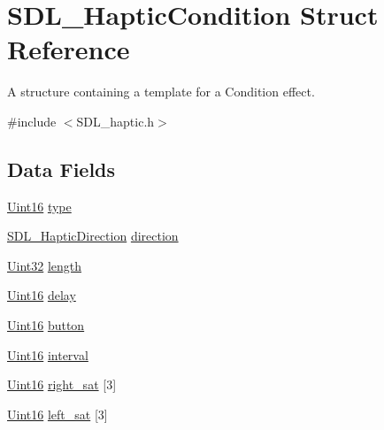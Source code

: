 \hypertarget{struct_s_d_l___haptic_condition}{}\section{S\+D\+L\+\_\+\+Haptic\+Condition Struct Reference}
\label{struct_s_d_l___haptic_condition}


A structure containing a template for a Condition effect.  




{\ttfamily \#include $<$S\+D\+L\+\_\+haptic.\+h$>$}

\subsection*{Data Fields}
\begin{DoxyCompactItemize}
\item 
\hyperlink{_s_d_l__stdinc_8h_a31fcc0a076c9068668173ee26d33e42b}{Uint16} \hyperlink{struct_s_d_l___haptic_condition_a8db4a3e9f29940892f2773bca31c74e1}{type}
\item 
\hyperlink{struct_s_d_l___haptic_direction}{S\+D\+L\+\_\+\+Haptic\+Direction} \hyperlink{struct_s_d_l___haptic_condition_a9fe6fc39233e26d6c0705ae77e43d96c}{direction}
\item 
\hyperlink{_s_d_l__stdinc_8h_add440eff171ea5f55cb00c4a9ab8672d}{Uint32} \hyperlink{struct_s_d_l___haptic_condition_afbde362d49894774c8b9c9e85ac0a913}{length}
\item 
\hyperlink{_s_d_l__stdinc_8h_a31fcc0a076c9068668173ee26d33e42b}{Uint16} \hyperlink{struct_s_d_l___haptic_condition_a069408e960d0f2ba482421f2dd2ec003}{delay}
\item 
\hyperlink{_s_d_l__stdinc_8h_a31fcc0a076c9068668173ee26d33e42b}{Uint16} \hyperlink{struct_s_d_l___haptic_condition_a9dab31b41646c5d046ea33d0cfb3794a}{button}
\item 
\hyperlink{_s_d_l__stdinc_8h_a31fcc0a076c9068668173ee26d33e42b}{Uint16} \hyperlink{struct_s_d_l___haptic_condition_a263a60513b1bdb1e91b28bd2e128e9d4}{interval}
\item 
\hyperlink{_s_d_l__stdinc_8h_a31fcc0a076c9068668173ee26d33e42b}{Uint16} \hyperlink{struct_s_d_l___haptic_condition_ac923a3cfe907fc31483f4103516bf280}{right\+\_\+sat} \mbox{[}3\mbox{]}
\item 
\hyperlink{_s_d_l__stdinc_8h_a31fcc0a076c9068668173ee26d33e42b}{Uint16} \hyperlink{struct_s_d_l___haptic_condition_a688464086e8f5b3fb30c63c687c90fd6}{left\+\_\+sat} \mbox{[}3\mbox{]}

\end{DoxyCompactItemize}
